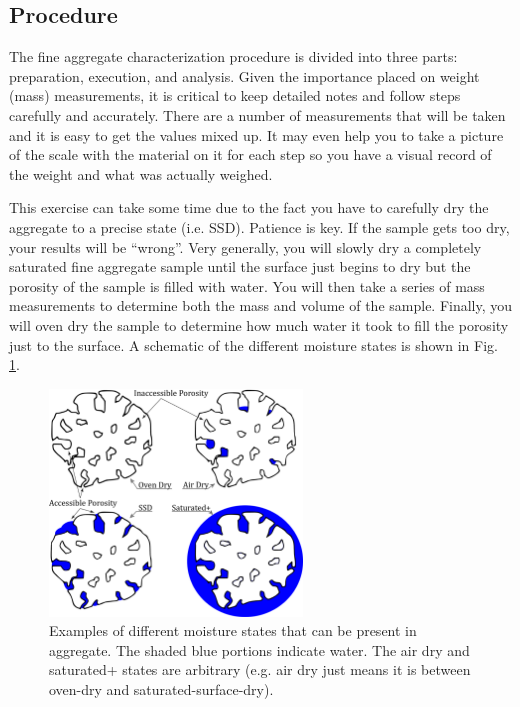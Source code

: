 \documentclass[12pt]{article}
\begin{document}
\pagebreak
\subsection{Procedure}
The fine aggregate characterization procedure is divided into three parts: preparation, execution, and analysis. Given the importance placed on weight (mass) measurements, it is critical to keep detailed notes and follow steps carefully and accurately. There are a number of measurements that will be taken and it is easy to get the values mixed up. It may even help you to take a picture of the scale with the material on it for each step so you have a visual record of the weight and what was actually weighed.

This exercise can take some time due to the fact you have to carefully dry the aggregate to a precise state (i.e. SSD). Patience is key. If the sample gets too dry, your results will be ``wrong''. Very generally, you will slowly dry a completely saturated fine aggregate sample until the surface just begins to dry but the porosity of the sample is filled with water. You will then take a series of mass measurements to determine both the mass and volume of the sample. Finally, you will oven dry the sample to determine how much water it took to fill the porosity just to the surface. A schematic of the different moisture states is shown in Fig. \ref{fig:moisturestates}.

\begin{figure}[H]
    \centering
    \includegraphics[width=0.6\textwidth]{Moisture_States_Schematic.png}
    \caption{Examples of different moisture states that can be present in aggregate. The shaded blue portions indicate water. The air dry and saturated+ states are arbitrary (e.g. air dry just means it is between oven-dry and saturated-surface-dry).}
    \label{fig:moisturestates}
\end{figure}
\end{document}

